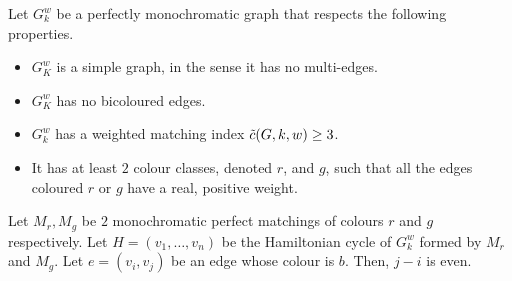 \begin{observation}
    \label{obs:2_positive_classes_parity_crossing_edge}
    Let $G_k^w$ be a perfectly monochromatic graph that respects the following properties.
    \begin{itemize}
        \item $G_K^w$ is a simple graph, in the sense it has no multi-edges.
        \item $G_K^w$ has no bicoloured edges.
        \item $G_k^w$ has a weighted matching index $\Tilde{c}(G, k, w) \geq 3$.
        \item It has at least $2$ colour classes, denoted $r$, and $g$, such that all the edges coloured $r$ or $g$ have a real, positive weight.
    \end{itemize}
    Let $M_r, M_g$ be $2$ monochromatic perfect matchings of colours $r$ and $g$ respectively.
    Let $H = (v_1, \dots, v_n)$ be the Hamiltonian cycle of $G_k^w$ formed by $M_r$ and $M_g$.
    Let $e = (v_i, v_j)$ be an edge whose colour is $b$.
    Then, $j-i$ is even.
\end{observation}

